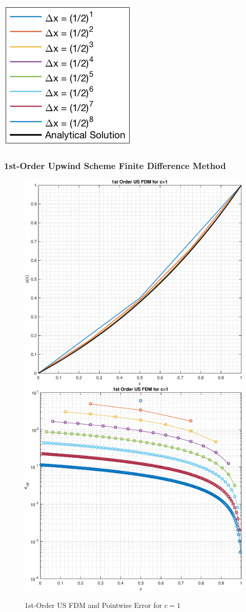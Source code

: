 \documentclass[10pt, reqno]{article}		%
\numberwithin{equation}{section}
\begin{document}
\begin{center}
	\includegraphics[height = 0.25\linewidth]{legend}
\end{center}

\subsubsection{1st-Order Upwind Scheme Finite Difference Method}

\begin{figure}[H]
	\begin{center}
		\includegraphics[width = 0.49\linewidth]{solution_1st_order_us_c_1}
		\includegraphics[width = 0.49\linewidth]{pointwise_error_1st_order_us_c_1}
		\caption{1st-Order US FDM and Pointwise Error for $c = 1$}
	\end{center}
\end{figure}
\end{document}
